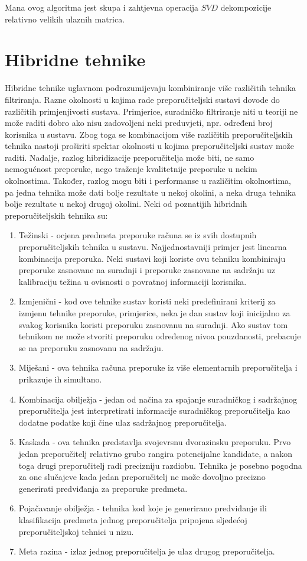 \documentclass[times, utf8, diplomski, numeric]{fer}
\begin{document}
Mana ovog algoritma jest skupa i zahtjevna operacija $SVD$ dekompozicije
relativno velikih ulaznih matrica.

\section{Hibridne tehnike}
Hibridne tehnike uglavnom podrazumijevaju kombiniranje više različitih tehnika
filtriranja. Razne okolnosti u kojima rade preporučiteljski sustavi dovode do
različitih primjenjivosti sustava. Primjerice, suradničko filtriranje niti u
teoriji ne može raditi dobro ako nisu zadovoljeni neki preduvjeti, npr.
određeni broj korisnika u sustavu. Zbog toga se kombinacijom više različitih
preporučiteljskih tehnika nastoji proširiti spektar okolnosti u kojima
preporučiteljski sustav može raditi. Nadalje, razlog hibridizacije
preporučitelja može biti, ne samo nemogućnost preporuke, nego traženje
kvalitetnije preporuke u nekim okolnostima. Također, razlog mogu biti i
performanse u različitim okolnostima, pa jedna tehnika može dati bolje rezultate
u nekoj okolini, a neka druga tehnika bolje rezultate u nekoj drugoj okolini.
Neki od poznatijih hibridnih preporučiteljskih tehnika su: \cite{RSHandbook}

\begin{enumerate}
  \item Težinski - ocjena predmeta preporuke računa se iz svih dostupnih
  preporučiteljskih tehnika u sustavu. Najjednostavniji primjer jest linearna
  kombinacija preporuka. Neki sustavi koji koriste ovu tehniku kombiniraju
  preporuke zasnovane na suradnji i preporuke zasnovane na sadržaju uz
  kalibraciju težina u ovisnosti o povratnoj informaciji korisnika.
  \item Izmjenični - kod ove tehnike sustav koristi neki predefinirani kriterij
  za izmjenu tehnike preporuke, primjerice, neka je dan sustav koji inicijalno
  za svakog korisnika koristi preporuku zasnovanu na suradnji. Ako sustav tom
  tehnikom ne može stvoriti preporuku određenog nivoa pouzdanosti, prebacuje se
  na preporuku zasnovanu na sadržaju.
  \item Miješani - ova tehnika računa preporuke iz više elementarnih
  preporučitelja i prikazuje ih simultano.
  \item Kombinacija obilježja - jedan od načina za spajanje suradničkog i
  sadržajnog preporučitelja jest interpretirati informacije suradničkog
  preporučitelja kao dodatne podatke koji čine ulaz sadržajnog preporučitelja.
  \item Kaskada - ova tehnika predstavlja svojevrsnu dvorazinsku preporuku. Prvo
  jedan preporučitelj relativno grubo rangira potencijalne kandidate, a nakon
  toga drugi preporučitelj radi precizniju razdiobu. Tehnika je posebno pogodna
  za one slučajeve kada jedan preporučitelj ne može dovoljno precizno generirati
  predviđanja za preporuke predmeta.
  \item Pojačavanje obilježja - tehnika kod koje je generirano predviđanje ili
  klasifikacija predmeta jednog preporučitelja pripojena sljedećoj
  preporučiteljskoj tehnici u nizu.
  \item Meta razina - izlaz jednog preporučitelja je ulaz drugog preporučitelja.
\end{enumerate}
\end{document}
